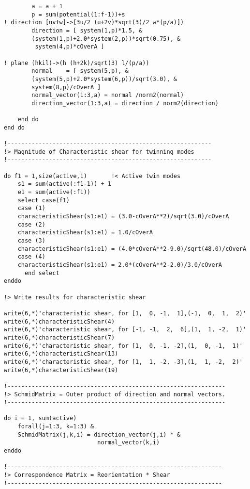 \begin{verbatim}
        a = a + 1
        p = sum(potential(1:f-1))+s                                         
! direction [uvtw]->[3u/2 (u+2v)*sqrt(3)/2 w*(p/a)])       
        direction = [ system(1,p)*1.5, &
        (system(1,p)+2.0*system(2,p))*sqrt(0.75), &
         system(4,p)*cOverA ]
            
! plane (hkil)->(h (h+2k)/sqrt(3) l/(p/a))
        normal    = [ system(5,p), &
        (system(5,p)+2.0*system(6,p))/sqrt(3.0), &
        system(8,p)/cOverA ]                                              
        normal_vector(1:3,a) = normal /norm2(normal)
        direction_vector(1:3,a) = direction / norm2(direction)
            
    end do
end do

!-----------------------------------------------------------
!> Magnitude of Characteristic shear for twinning modes 
!-----------------------------------------------------------

do f1 = 1,size(active,1)       !< Active twin modes
    s1 = sum(active(:f1-1)) + 1
    e1 = sum(active(:f1))
    select case(f1)
    case (1)
    characteristicShear(s1:e1) = (3.0-cOverA**2)/sqrt(3.0)/cOverA
    case (2)
    characteristicShear(s1:e1) = 1.0/cOverA
    case (3)
    characteristicShear(s1:e1) = (4.0*cOverA**2-9.0)/sqrt(48.0)/cOverA
    case (4)
    characteristicShear(s1:e1) = 2.0*(cOverA**2-2.0)/3.0/cOverA
      end select
enddo
    
!> Write results for characteristic shear

write(6,*)'characteristic shear, for [1,  0, -1,  1],(-1,  0,  1,  2)'
write(6,*)characteristicShear(4)
write(6,*)'characteristic shear, for [-1, -1,  2,  6],(1,  1, -2,  1)'
write(6,*)characteristicShear(7)
write(6,*)'characteristic shear, for [1,  0, -1, -2],(1,  0, -1,  1)'
write(6,*)characteristicShear(13)
write(6,*)'characteristic shear, for [1,  1, -2, -3],(1,  1, -2,  2)'
write(6,*)characteristicShear(19)
    
!---------------------------------------------------------------
!> SchmidMatrix = Outer product of direction and normal vectors.
!---------------------------------------------------------------

do i = 1, sum(active)
    forall(j=1:3, k=1:3) &
    SchmidMatrix(j,k,i) = direction_vector(j,i) * &
                           normal_vector(k,i)
enddo

!--------------------------------------------------------------
!> Correspondence Matrix = Reorientation * Shear
!--------------------------------------------------------------


\end{verbatim}
